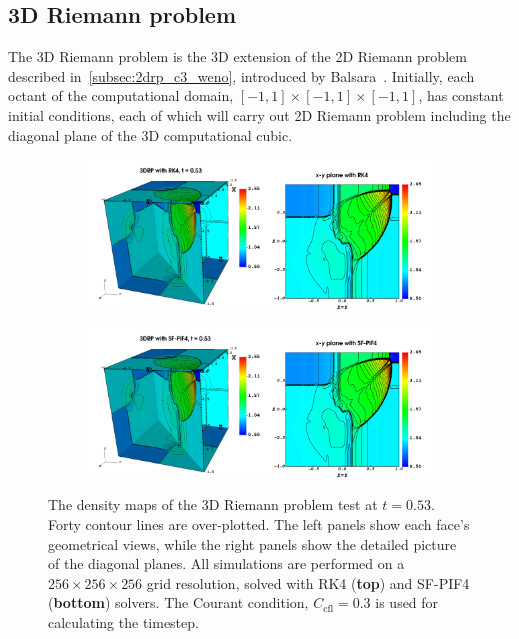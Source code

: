 \subsection{3D Riemann problem}\label{subsec:3drp}

The 3D Riemann problem is the 3D extension of the 2D Riemann problem described in~\cref{subsec:2drp_c3_weno},
introduced by Balsara~\cite{balsara2015three}.
Initially, each octant of the computational domain,
\( [-1, 1] \times [-1, 1] \times [-1, 1]\),
has constant initial conditions,
each of which will carry out 2D Riemann problem
including the diagonal plane of the 3D computational cubic.

\begin{figure}
    \centering
    \begin{subfigure}{\textwidth}
        \centering
        \includegraphics[width=\textwidth]{fig/3drp_all_rk4.png}
    \end{subfigure}
    \begin{subfigure}{\textwidth}
        \centering
        \includegraphics[width=\textwidth]{fig/3drp_all_sf4.png}
    \end{subfigure}
    \caption{The density maps of the 3D Riemann problem test at \( t = 0.53 \).
        Forty contour lines are over-plotted.
        The left panels show each face's geometrical views, while 
        the right panels show
        the detailed picture of the diagonal planes.
        All simulations are performed on a \( 256 \times 256 \times 256 \) grid resolution,
        solved with RK4 (\textbf{top}) and SF-PIF4 (\textbf{bottom}) solvers.
        The Courant condition, \( C_{\text{cfl}} = 0.3 \) is used for
        calculating the timestep.
    }\label{fig:3drp}
\end{figure}

